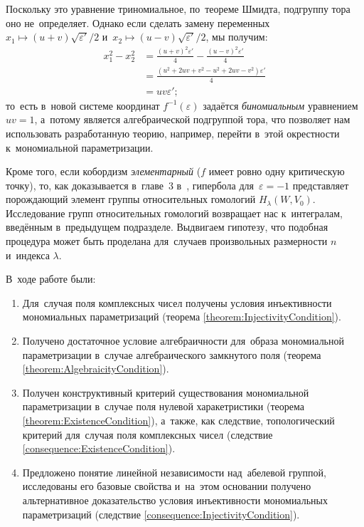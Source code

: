 \documentclass[a4paper,oneside]{article}
\begin{document}
Поскольку это уравнение триномиальное, по~теореме Шмидта, подгруппу тора оно не~определяет.
Однако если сделать замену переменных $x_1 \mapsto (u + v) \sqrt{\varepsilon'} / 2$
и~$x_2 \mapsto (u - v) \sqrt{\varepsilon'} / 2$, мы получим:
\[
\begin{aligned}
  x_1^2 - x_2^2 &= \frac{(u + v)^2 \varepsilon'}{4} - \frac{(u - v)^2 \varepsilon'}{4} \\
                &= \frac{(u^2 + 2uv + v^2 - u^2 + 2uv - v^2)\varepsilon'}{4} \\
                &= uv \varepsilon';
\end{aligned}
\]
то~есть в~новой системе координат $f^{-1}(\varepsilon)$ задаётся \textit{биномиальным} уравнением $uv = 1$,
а~потому является алгебраической подгруппой тора, что позволяет нам использовать разработанную теорию,
например, перейти в~этой окрестности к~мономиальной параметризации.

Кроме того, если кобордизм \textit{элементарный} ($f$ имеет ровно одну критическую точку), то, как доказывается
в~главе~3 в~\cite{Mil65}, гипербола для~$\varepsilon = -1$ представляет порождающий элемент группы относительных
гомологий $H_\lambda(W, V_0)$. Исследование групп относительных гомологий возвращает нас к~интегралам, введённым
в~предыдущем подразделе. Выдвигаем гипотезу, что подобная процедура может быть проделана для~случаев произвольных
размерности $n$ и~индекса $\lambda$.

\pagebreak
{}
В~ходе работе были:
\begin{enumerate}
  \item Для~случая поля комплексных чисел получены условия инъективности мономиальных параметризаций (теорема \ref{theorem:InjectivityCondition}).
  \item Получено достаточное условие алгебраичности для~образа мономиальной параметризации
        в~случае алгебраического замкнутого поля (теорема \ref{theorem:AlgebraicityCondition}).
  \item Получен конструктивный критерий существования мономиальной параметризации
        в~случае поля нулевой харакетристики (теорема \ref{theorem:ExistenceCondition}), а~также,
        как следствие, топологический критерий для~случая поля комплексных чисел (следствие \ref{consequence:ExistenceCondition}).
  \item Предложено понятие линейной независимости над~абелевой группой, исследованы его базовые свойства
        и~на~этом основании получено альтернативное доказательство условия инъективности мономиальных
        параметризаций (следствие \ref{consequence:InjectivityCondition}).
\end{enumerate}
\end{document}
